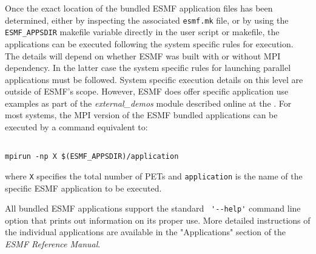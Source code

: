 Once the exact location of the bundled ESMF application files has been 
determined, either by inspecting the associated {\tt esmf.mk} file, or by using 
the {\tt ESMF\_APPSDIR} makefile variable directly in the user script or 
makefile, the applications can be executed following the system specific rules 
for execution. The details will depend on whether ESMF was built with or without 
MPI dependency. In the latter case the system specific rules for launching 
parallel applications must be followed. System specific execution details on 
this level are outside of ESMF's scope. However, ESMF does offer specific 
application use examples as part of the {\it external\_demos} module described 
online at the 
. 
For most systems, the MPI version of the ESMF bundled applications can be 
executed by a command equivalent to:

\begin{verbatim}

mpirun -np X $(ESMF_APPSDIR)/application

\end{verbatim}
 
where {\tt X} specifies the total number of PETs and {\tt application} is the 
name of the specific ESMF application to be executed.
 
All bundled ESMF applications support the standard \verb+ '--help'+ command line 
option that prints out information on its proper use.  More detailed 
instructions of the individual applications are available in the "Applications" 
section of the {\it ESMF Reference Manual}.
